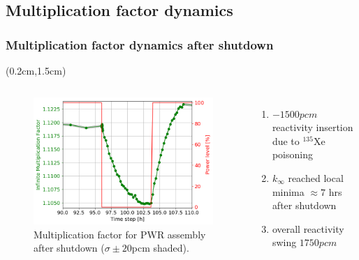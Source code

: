 \subsection{Multiplication factor dynamics}

\begin{frame}
\frametitle{Multiplication factor dynamics after shutdown}
\begin{textblock*}{12.5cm}(0.2cm,1.5cm) %
\begin{columns}
	\column[t]{6cm}
	\begin{figure}[t]
		\includegraphics[width=\linewidth]{./images/pwr_keff_zoomed.png}
		\vspace{-6mm}
		\caption{Multiplication factor for PWR assembly after 
		shutdown ($\sigma\pm20$pcm shaded).}
	\end{figure}
		\vspace{-5mm}
	\begin{enumerate}             
		\item $-1500pcm$ reactivity insertion due to $^{135}$Xe poisoning
		\item $k_{\infty}$ reached local minima $\approx7$ hrs after shutdown
		\item overall reactivity swing $1750pcm$
	\end{enumerate}

	\column[t]{6cm}
\end{columns}
\end{textblock*}
\end{frame}
